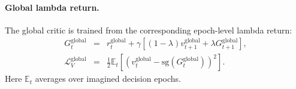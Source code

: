 \paragraph{Global lambda return.}  The global critic is trained from the
corresponding epoch-level lambda return:
\begin{equation}
\begin{array}{rcl}
G_t^{\mathrm{global}}
&=&
r_t^{\mathrm{global}}
+\gamma\left[
(1-\lambda)v_{t+1}^{\mathrm{global}}
+\lambda G_{t+1}^{\mathrm{global}}
\right],\\[0.35em]
\mathcal{L}_{V}^{\mathrm{global}}
&=&
\displaystyle
\frac{1}{2}\mathbb{E}_{t}
\left[
(v_t^{\mathrm{global}}
-\mathrm{sg}(G_t^{\mathrm{global}}))^2
\right].
\end{array}
\end{equation}
Here \(\mathbb{E}_t\) averages over imagined decision epochs.
